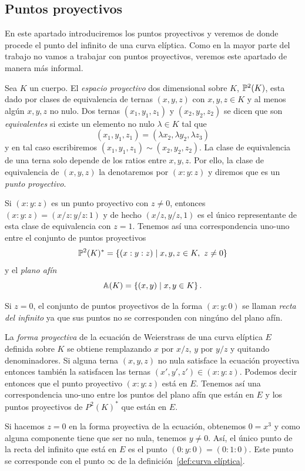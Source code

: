 \subsection{Puntos proyectivos}
\label{sub:Puntos proyectivos}

En este apartado introduciremos los puntos proyectivos y veremos de donde procede el punto del infinito de una curva elíptica. Como en la mayor parte del trabajo no vamos a trabajar con puntos proyectivos, veremos este apartado de manera más informal.

Sea $K$ un cuerpo. El \emph{espacio proyectivo} dos dimensional sobre $K$, $\P^2(K)$, esta dado por clases de equivalencia de ternas $(x, y, z)$ con $x, y, z \in K$ y al menos algún $x, y, z$ no nulo. Dos ternas $(x_1, y_1, z_1)$ y $(x_2, y_2, z_2)$ se dicen que son \emph{equivalentes} si existe un elemento no nulo $\lambda \in K$ tal que
$$
	(x_1, y_1, z_1) = (\lambda x_2, \lambda y_2, \lambda z_3)
$$
y en tal caso escribiremos $(x_1, y_1, z_1) \sim (x_2, y_2, z_2)$. La clase de equivalencia de una terna solo depende de los ratios entre $x, y, z$. Por ello, la clase de equivalencia de $(x, y, z)$ la denotaremos por $(x : y : z)$ y diremos que es un \emph{punto proyectivo}.

Si $(x : y : z)$ es un punto proyectivo con $z \neq 0$, entonces $(x : y : z) = (x/z : y/z : 1)$ y de hecho $(x/z, y/z, 1)$ es el único representante de esta clase de equivalencia con $z = 1$. Tenemos así una correspondencia uno-uno entre el conjunto de puntos proyectivos
$$
	\P^2(K)^* = \left\{(x : y : z) \mid x, y, z \in K,\ z \neq 0 \right\}
$$
y el \emph{plano afín}
$$
	\A(K) = \left\{(x, y) \mid x, y \in K \right\}.
$$

Si $z = 0$, el conjunto de puntos proyectivos de la forma $(x : y : 0)$ se llaman \emph{recta del infinito} ya que sus puntos no se corresponden con ningúno del plano afín.

La \emph{forma proyectiva} de la ecuación de Weierstrass de una curva elíptica $E$ definida sobre $K$ se obtiene remplazando $x$ por $x/z$, $y$ por $y/z$ y quitando denominadores. Si alguna terna $(x, y, z)$ no nula satisface la ecuación proyectiva entonces también la satisfacen las ternas $(x', y', z') \in (x : y : z)$. Podemos decir entonces que el punto proyectivo $(x : y : z)$ está en $E$. Tenemos así una correspondencia uno-uno entre los puntos del plano afín que están en $E$ y los puntos proyectivos de $P^2(K)^*$ que están en $E$.

Si hacemos $z = 0$ en la forma proyectiva de la ecuación, obtenemos $0 = x^3$ y como alguna componente tiene que ser no nula, tenemos $y \neq 0$. Así, el único punto de la recta del infinito que está en $E$ es el punto $(0 : y : 0) = (0 : 1 : 0)$. Este punto se corresponde con el punto $\infty$ de la definición~\ref{def:curva elíptica}.

